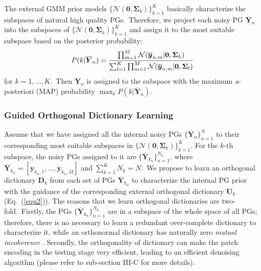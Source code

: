 The external GMM prior models $\{\mathcal{N}(\bm{0},\bm{\Sigma}_{k})\}_{k=1}^{K}$ basically characterize the subspaces of natural high quality PGs.\ Therefore, we project each noisy PG $\bm{\overline{Y}}_{n}$ into the subspaces of $\{\mathcal{N}(\bm{0},\bm{\Sigma}_{k})\}_{k=1}^{K}$ and assign it to the most suitable subspace based on the posterior probability:
\vspace{-2mm}
\begin{equation}\label{equ3-3}
\vspace{-2mm}
P(k|\bm{\overline{Y}}_{n})=\frac{\prod_{m=1}^{M}\mathcal{N}(\bm{\overline{y}}_{n,m}|\bm{0},\bm{\Sigma}_{k})}{\sum_{l=1}^{K}\prod_{m=1}^{M}\mathcal{N}(\bm{\overline{y}}_{n,m}|\bm{0},\bm{\Sigma}_{l})}
\end{equation}
for $k=1,...,K$.\ Then $\bm{\overline{Y}}_{n}$ is assigned to the subspace with the maximum \emph{a}-posteriori (MAP) probability $\max_{k}P(k|\bm{\overline{Y}}_{n})$.


\subsubsection{Guided Orthogonal Dictionary Learning}

Assume that we have assigned all the internal noisy PGs $\{\bm{\overline{Y}}_{n}\}_{n=1}^{N}$ to their corresponding most suitable subspaces in $\{\mathcal{N}(\bm{0},\bm{\Sigma}_{k})\}_{k=1}^{K}$. For the $k$-th subspace, the noisy PGs assigned to it are $\{\bm{\overline{Y}}_{k_{n}}\}_{n=1}^{N_{k}}$, where $\bm{\overline{Y}}_{k_{n}}=[\bm{\overline{y}}_{k_{n},1},...,\bm{\overline{y}}_{k_{n},M}]$ and $\sum_{k=1}^{K}N_{k}=N$.\ We propose to learn an orthogonal dictionary $\bm{D}_{k}$ from each set of PGs $\bm{\overline{Y}}_{k_{n}}$ to characterize the internal PG prior with the guidance of the corresponding external orthogonal dictionary $\bm{U}_{k}$ (Eq.\ (\ref{equ2})). The reasons that we learn orthogonal dictionaries are two-fold.\ Firstly, the PGs $\{\bm{\overline{Y}}_{k_{n}}\}_{n=1}^{N_{k}}$ are in a subspace of the whole space of all PGs; therefore, there is no necessary to learn a redundant over-complete dictionary to characterize it, while an orthonormal dictionary has naturally zero \emph{mutual incoherence} \cite{donoho2001uncertainty}. Secondly, the orthogonality of dictionary can make the patch encoding in the testing stage very efficient, leading to an efficient denoising algorithm (please refer to sub-section III-C for more details).

